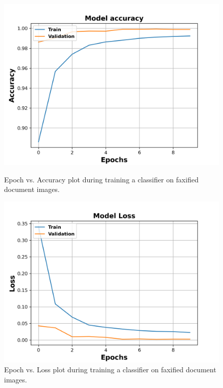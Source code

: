 \vspace*{1.5cm}
\begin{figure}[H]
  \centering
  \begin{minipage}[b]{0.49\textwidth}
    \includegraphics[width=\textwidth]{images/Evaluation/Faxified_Data_Classifier_2021-05-31_19-31-35_Accuracy.png}
    \caption[Epoch vs. Accuracy plot during training a classifier on faxified document images.]{Epoch vs. Accuracy plot during training a classifier on  faxified document images.}
    \label{fig:FaxifiedClassifierAcc}
  \end{minipage}
  \hfill
  \begin{minipage}[b]{0.49\textwidth}
    \includegraphics[width=\textwidth]{images/Evaluation/Faxified_Data_Classifier_2021-05-31_19-31-35_Loss.png}
    \caption[Epoch vs. Loss plot during training a classifier on faxified document images.]{Epoch vs. Loss plot during training a classifier on faxified document images.}
    \label{fig:FaxifiedClassifierLoss}
  \end{minipage}
\end{figure}






